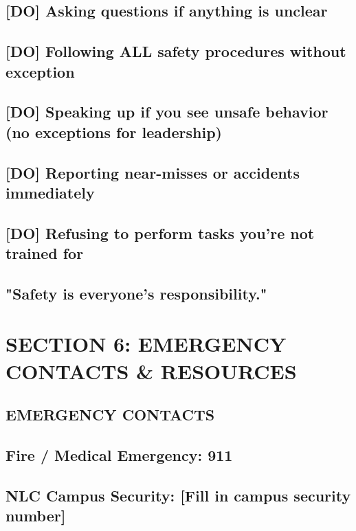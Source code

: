 \documentclass[11pt,letterpaper]{article}
\begin{document}
{{\subsection*{[DO] Asking questions if anything is unclear}

\subsection*{[DO] Following ALL safety procedures without exception}

\subsection*{[DO] Speaking up if you see unsafe behavior (no exceptions for leadership)}

\subsection*{[DO] Reporting near-misses or accidents immediately}

\subsection*{[DO] Refusing to perform tasks you're not trained for}

\subsection*{"Safety is everyone's responsibility."}

\section{SECTION 6: EMERGENCY CONTACTS \& RESOURCES}

\subsection*{EMERGENCY CONTACTS}

\subsection*{Fire / Medical Emergency:        911}

\subsection*{NLC Campus Security:             [Fill in campus security number]}

}}
\end{document}
